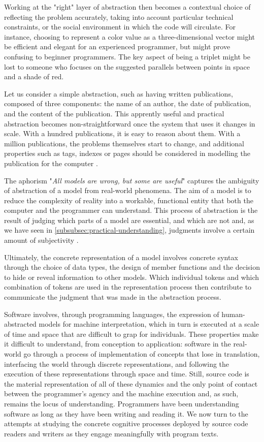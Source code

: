 Working at the "right" layer of abstraction then becomes a contextual choice of reflecting the problem accurately, taking into account particular technical constraints, or the social environment in which the code will circulate. For instance, choosing to represent a color value as a three-dimensional vector might be efficient and elegant for an experienced programmer, but might prove confusing to beginner programmers. The key aspect of being a triplet might be lost to someone who focuses on the suggested parallels between points in space and a shade of red.

Let us consider a simple abstraction, such as having written publications, composed of three components: the name of an author, the date of publication, and the content of the publication. This apprently useful and practical abstraction becomes non-straightforward once the system that uses it changes in scale. With a hundred publications, it is easy to reason about them. With a million publications, the problems themselves start to change, and additional properties such as tags, indexes or pages should be considered in modelling the publication for the computer \citep{cities_peter_2022}.

The aphorism "\emph{All models are wrong, but some are useful}" \citep{box_science_1976} captures the ambiguity of abstraction of a model from real-world phenomena. The aim of a model is to reduce the complexity of reality into a workable, functional entity that both the computer and the programmer can understand. This process of abstraction is the result of judging which parts of a model are essential, and which are not and, as we have seen in \autoref{subsubsec:practical-understanding}, judgments involve a certain amount of subjectivity \citep{weizenbaum_computer_1976}.

Ultimately, the concrete representation of a model involves concrete syntax through the choice of data types, the design of member functions and the decision to hide or reveal information to other models. Which individual tokens and which combination of tokens are used in the representation process then contribute to communicate the judgment that was made in the abstraction process.

\spacersmall

Software involves, through programming languages, the expression of human-abstracted models for machine interpretation, which in turn is executed at a scale of time and space that are difficult to grap for individuals. These properties make it difficult to understand, from conception to application: software in the real-world go through a process of implementation of concepts that lose in translation, interfacing the world through discrete representations, and following the execution of these representations through space and time. Still, source code is the material representation of all of these dynamics and the only point of contact between the programmer's agency and the machine execution and, as such, remains the locus of understanding. Programmers have been understanding software as long as they have been writing and reading it. We now turn to the attempts at studying the concrete cognitive processes deployed by source code readers and writers as they engage meaningfully with program texts.

